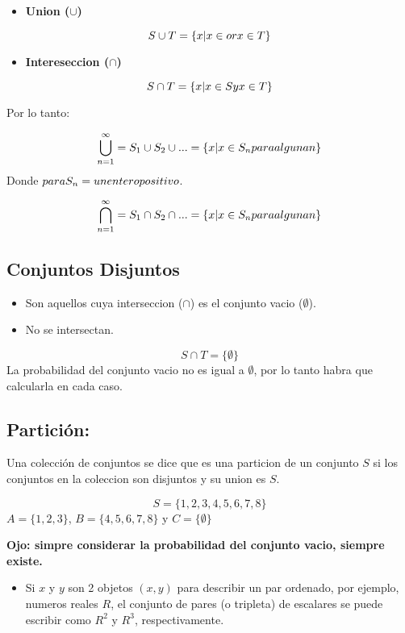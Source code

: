 \documentclass[]{book}
\providecommand{\tightlist}{%
  \setlength{\itemsep}{0pt}\setlength{\parskip}{0pt}}
\begin{document}
\begin{itemize}
\tightlist
\item
  \textbf{Union (\(\cup\))}
\end{itemize}

\[S \cup T = \{x|x \in or\space x\in T\}\]

\begin{itemize}
\tightlist
\item
  \textbf{Intereseccion (\(\cap\))}
\end{itemize}

\[S \cap T = \{x|x \in S\space y \space x \in T \} \]

 Por lo tanto:

\[\bigcup_{n=1}^{\infty}= S_1 \cup S_2 \cup ...= \{ x|x \in S_n para \space alguna\space n\} \]
Donde \(para\space S_n = \space un \space entero \space positivo\).

\[ \bigcap_{n=1}^{\infty} = S_1 \cap S_2 \cap ... = \{ x|x \in S_n \space para \space alguna \space n\}\]

\subsection{Conjuntos Disjuntos}\label{conjuntos-disjuntos}

\begin{itemize}
\tightlist
\item
  Son aquellos cuya interseccion (\(\cap\)) es el conjunto vacio
  (\(\emptyset\)).
\item
  No se intersectan.
\end{itemize}

\[S \cap T = \{ \emptyset\}\] La probabilidad del conjunto vacio no es
igual a \(\emptyset\), por lo tanto habra que calcularla en cada caso.

\subsection{Partición:}\label{particion}

Una colección de conjuntos se dice que es una particion de un conjunto
\(S\) si los conjuntos en la coleccion son disjuntos y su union es
\(S\).

\[S = \{1,2,3,4,5,6,7,8\}\] \(A = \{1,2,3\}\), \(B = \{4,5,6,7,8\}\) y
\(C = \{\emptyset\}\)

 \textbf{Ojo: simpre considerar la probabilidad del conjunto vacio,
siempre existe.}

\begin{itemize}
\tightlist
\item
  Si \(x\) y \(y\) son 2 objetos \((x,y)\) para describir un par
  ordenado, por ejemplo, numeros reales \(R\), el conjunto de pares (o
  tripleta) de escalares se puede escribir como \(R^2\) y \(R^3\),
  respectivamente.
\end{itemize}
\end{document}
